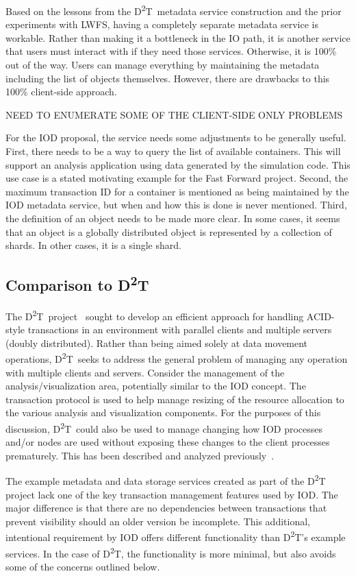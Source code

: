 \documentclass[conference]{sig-alt-gov2}
\newcommand{\DDT}{D\textsuperscript{2}T~}
\newcommand{\DDTns}{D\textsuperscript{2}T}
\begin{document}
Based on the lessons from the \DDT metadata service construction and the prior
experiments with LWFS, having a completely separate metadata service is
workable. Rather than making it a bottleneck in the IO path, it is another
service that users must interact with if they need those services. Otherwise,
it is 100\% out of the way. Users can manage everything by maintaining the
metadata including the list of objects themselves. However, there are drawbacks
to this 100\% client-side approach.

NEED TO ENUMERATE SOME OF THE CLIENT-SIDE ONLY PROBLEMS

For the IOD proposal, the service needs some adjustments to be generally
useful.  First, there needs to be a way to query the list of available
containers. This will support an analysis application using data generated by
the simulation code. This use case is a stated motivating example for the Fast
Forward project. Second, the maximum transaction ID for a container is
mentioned as being maintained by the IOD metadata service, but when and how
this is done is never mentioned.  Third, the definition of an object needs to
be made more clear. In some cases, it seems that an object is a globally
distributed object is represented by a collection of shards. In other cases, it
is a single shard.

\subsection{Comparison to \DDTns}
The \DDT project~\cite{lofstead:2012:txn} sought to develop an efficient
approach for handling ACID-style transactions in an environment with parallel
clients and multiple servers (doubly distributed). Rather than being aimed
solely at data movement operations, \DDT seeks to address the general problem
of managing any operation with multiple clients and servers.  Consider the
management of the analysis/visualization area, potentially similar to the IOD
concept. The transaction protocol is used to help manage resizing of the
resource allocation to the various analysis and visualization components.  For
the purposes of this discussion, \DDT could also be used to manage changing how
IOD processes and/or nodes are used without exposing these changes to the
client processes prematurely.  This has been described and analyzed
previously~\cite{dayal:2013:io-containers}.

The example metadata and data storage services created as part of the \DDT
project lack one of the key transaction management features used by IOD.
The major difference is that there are no dependencies between transactions
that prevent visibility should an older version be incomplete. This additional,
intentional requirement by IOD offers different functionality than \DDTns's
example services. In the case of \DDTns, the functionality is more minimal, but
also avoids some of the concerns outlined below.
\end{document}
